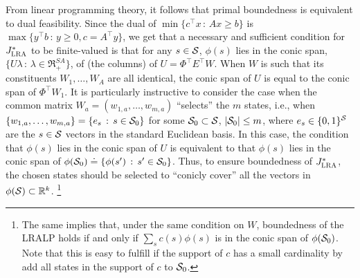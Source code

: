 \documentclass[12pt,draftcls,onecolumn]{IEEEtran}
\begin{document}
From linear programming theory, it follows that primal boundedness is equivalent to dual feasibility. 
Since the dual of $\min\{c^\top x\,:\, Ax \ge b \}$ is 
$\max\{ y^\top b\,:\, y \ge 0, c = A^\top y\}$, we get
that a necessary and sufficient condition for $\Jlro$ 
to be finite-valued is that for any $s\in \S$, $\phi(s)$ lies in the conic span, 
$\{ U \lambda\,:\, \lambda\in \Re_+^{SA}\}$, of (the columns) of $U = \Phi^\top E^\top W$.
When $W$ is such that its constituents $W_1,\dots,W_A$ are all identical, 
the conic span of $U$ is equal to the conic span of $\Phi^\top W_1$. 
It is particularly instructive 
to consider the case when the common matrix $W_a = (w_{1,a},\dots,w_{m,a})$ ``selects'' the $m$ states,
i.e., when $\{w_{1,a},\dots,w_{m,a}\}= \{ e_{s}\,:\, s\in \S_0 \}$ for some $\S_0\subset \S$, $|\S_0|\le m$,
where $e_s\in \{0,1\}^\S$ are the $s\in \S$ vectors in the standard Euclidean basis.
In this case, the condition that $\phi(s)$ lies in the conic span of $U$ 
is equivalent to that $\phi(s)$ lies in the conic span of $\phi(\S_0) \doteq \{\phi(s')\,:\, s'\in \S_0\}$. 
Thus, to ensure boundedness of $\Jlro$, 
the chosen states should be selected to ``conicly cover'' all the vectors in $\phi(\S)\subset \Re^k$.%
\footnote{The same implies that, under the same condition on $W$, boundedness of the LRALP 
holds if and only if $\sum_s c(s) \phi(s)$ is in the conic span of $\phi(\S_0)$. Note that this is easy to fulfill
if the support of $c$ has a small cardinality by add all states in the support of $c$ to $\S_0$.
}
\end{document}
